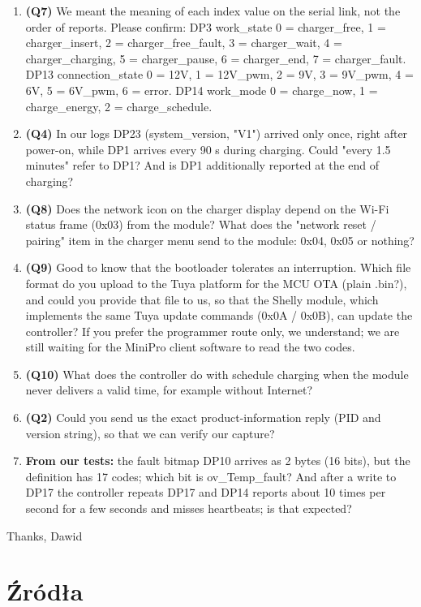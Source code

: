 \documentclass[11pt,a4paper]{article}
\begin{document}
\begin{enumerate}
\item \textbf{(Q7)} We meant the meaning of each index value on the serial link, not the order of reports. Please confirm: DP3 work\_state 0 = charger\_free, 1 = charger\_insert, 2 = charger\_free\_fault, 3 = charger\_wait, 4 = charger\_charging, 5 = charger\_pause, 6 = charger\_end, 7 = charger\_fault. DP13 connection\_state 0 = 12V, 1 = 12V\_pwm, 2 = 9V, 3 = 9V\_pwm, 4 = 6V, 5 = 6V\_pwm, 6 = error. DP14 work\_mode 0 = charge\_now, 1 = charge\_energy, 2 = charge\_schedule.
\item \textbf{(Q4)} In our logs DP23 (system\_version, "V1") arrived only once, right after power-on, while DP1 arrives every 90 s during charging. Could "every 1.5 minutes" refer to DP1? And is DP1 additionally reported at the end of charging?
\item \textbf{(Q8)} Does the network icon on the charger display depend on the Wi-Fi status frame (0x03) from the module? What does the "network reset / pairing" item in the charger menu send to the module: 0x04, 0x05 or nothing?
\item \textbf{(Q9)} Good to know that the bootloader tolerates an interruption. Which file format do you upload to the Tuya platform for the MCU OTA (plain .bin?), and could you provide that file to us, so that the Shelly module, which implements the same Tuya update commands (0x0A / 0x0B), can update the controller? If you prefer the programmer route only, we understand; we are still waiting for the MiniPro client software to read the two codes.
\item \textbf{(Q10)} What does the controller do with schedule charging when the module never delivers a valid time, for example without Internet?
\item \textbf{(Q2)} Could you send us the exact product-information reply (PID and version string), so that we can verify our capture?
\item \textbf{From our tests:} the fault bitmap DP10 arrives as 2 bytes (16 bits), but the definition has 17 codes; which bit is ov\_Temp\_fault? And after a write to DP17 the controller repeats DP17 and DP14 reports about 10 times per second for a few seconds and misses heartbeats; is that expected?
\end{enumerate}

Thanks, Dawid


\section*{Źródła}
\end{document}
